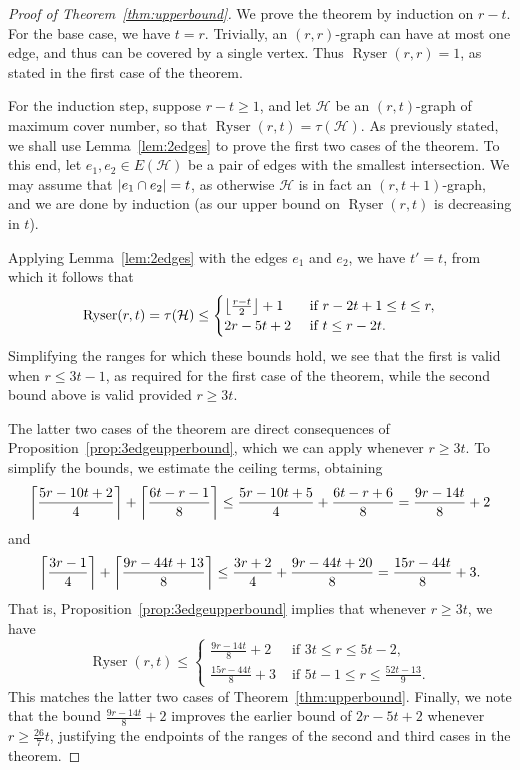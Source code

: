 \documentclass[a4paper,twoside,11pt]{article}
\DeclarePairedDelimiter{\floor}{\lfloor}{\rfloor}
\DeclarePairedDelimiter{\ceil}{\lceil}{\rceil}
\DeclarePairedDelimiter{\card}{|}{|}
\numberwithin{thm}{section}
\theoremstyle{definition}
\theoremstyle{remark}
\theoremstyle{definition}
\newcommand{\m}[1]{\mathcal{#1}}
\DeclareMathOperator{\Ryser}{Ryser}
\begin{document}
\begin{proof}[Proof of Theorem~\ref{thm:upperbound}]
We prove the theorem by induction on $r - t$.  For the base case, we have $t = r$.  Trivially, an $(r,r)$-graph can have at most one edge, and thus can be covered by a single vertex.  Thus $\Ryser(r,r) = 1$, as stated in the first case of the theorem.

For the induction step, suppose $r - t \ge 1$, and let $\m H$ be an $(r,t)$-graph of maximum cover number, so that $\Ryser(r,t) = \tau(\m H)$. As previously stated, we shall use Lemma~\ref{lem:2edges} to prove the first two cases of the theorem. To this end, let $e_1, e_2 \in E(\m H)$ be a pair of edges with the smallest intersection. We may assume that $\card{e_1 \cap e_2} = t$, as otherwise $\m H$ is in fact an $(r,t+1)$-graph, and we are done by induction (as our upper bound on $\Ryser(r,t)$ is decreasing in $t$).

Applying Lemma~\ref{lem:2edges} with the edges $e_1$ and $e_2$, we have $t' = t$, from which it follows that
\[ \Ryser(r,t) = \tau(\m H) \le \begin{cases}
    \floor*{\frac{r-t}{2}} + 1 & \mbox{ if } r - 2t + 1 \le t \le r, \\
    2r - 5t + 2 & \mbox{ if } t \le r - 2t.
\end{cases} \]
Simplifying the ranges for which these bounds hold, we see that the first is valid when $r \le 3t - 1$, as required for the first case of the theorem, while the second bound above is valid provided $r \ge 3t$.

The latter two cases of the theorem are direct consequences of Proposition~\ref{prop:3edgeupperbound}, which we can apply whenever $r \ge 3t$. To simplify the bounds, we estimate the ceiling terms, obtaining
\[ \ceil*{\frac{5r-10t+2}{4}} + \ceil*{\frac{6t-r-1}{8}} \le \frac{5r - 10t + 5}{4} + \frac{6t - r + 6}{8} = \frac{9r - 14t}{8} + 2 \]
and
\[ \ceil*{\frac{3r-1}{4}} + \ceil*{\frac{9r-44t+13}{8}} \le \frac{3r + 2}{4} + \frac{9r - 44t + 20}{8} = \frac{15r - 44t}{8} + 3. \]
That is, Proposition~\ref{prop:3edgeupperbound} implies that whenever $r \ge 3t$, we have
\[ \Ryser(r,t) \le \begin{cases}
    \frac{9r - 14t}{8} + 2 & \mbox{ if } 3t \le r \le 5t - 2, \\
    \frac{15r - 44t}{8} + 3 & \mbox{ if } 5t - 1 \le r \le \frac{52t - 13}{9}.
\end{cases} \]
This matches the latter two cases of Theorem~\ref{thm:upperbound}.  Finally, we note that the bound $\frac{9r - 14t}{8} + 2$ improves the earlier bound of $2r - 5t + 2$ whenever $r \ge \frac{26}{7}t$, justifying the endpoints of the ranges of the second and third cases in the theorem.
\end{proof}
\end{document}
